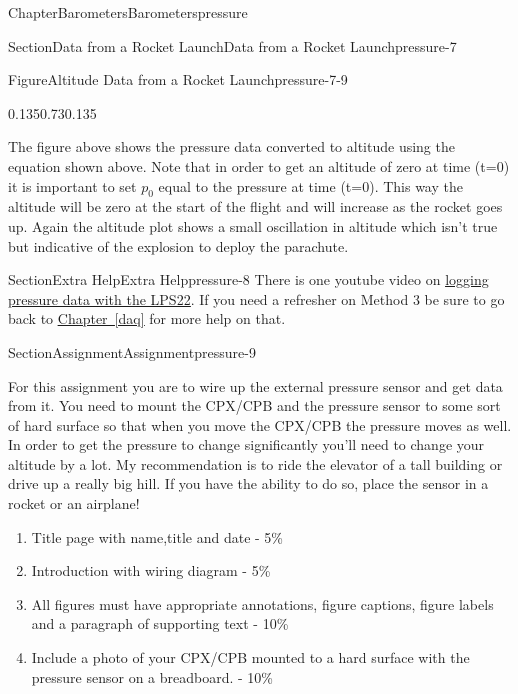 \documentclass[oneside,10pt,]{book}
\newcommand{\xreffont}{\relax}
\newcommand{\linkhilite}[1]{\underline{#1}}
\numberwithin{equation}{section}
\begin{document}
\begin{chapterptx}{Chapter}{Barometers}{}{Barometers}{}{}{pressure}
\begin{sectionptx}{Section}{Data from a Rocket Launch}{}{Data from a Rocket Launch}{}{}{pressure-7}
\begin{figureptx}{Figure}{Altitude Data from a Rocket Launch}{pressure-7-9}{}
\begin{image}{0.135}{0.73}{0.135}{}
\end{image}%
\tcblower
\end{figureptx}%
The figure above shows the pressure data converted to altitude using the equation shown above. Note that in order to get an altitude of zero at time (t=0) it is important to set \(p_0\) equal to the pressure at time (t=0). This way the altitude will be zero at the start of the flight and will increase as the rocket goes up. Again the altitude plot shows a small oscillation in altitude which isn't true but indicative of the explosion to deploy the parachute.%
\end{sectionptx}
%
%
\typeout{************************************************}
\typeout{************************************************}
%
\begin{sectionptx}{Section}{Extra Help}{}{Extra Help}{}{}{pressure-8}
There is one youtube video on \href{https://www.youtube.com/watch?v=MKq2glxVkMI}{\linkhilite{logging pressure data with the LPS22}}. If you need a refresher on Method 3 be sure to go back to \hyperref[daq]{\linkhilite{Chapter~{\xreffont\ref{daq}}}} for more help on that.%
\end{sectionptx}
%
%
\typeout{************************************************}
\typeout{************************************************}
%
\begin{sectionptx}{Section}{Assignment}{}{Assignment}{}{}{pressure-9}
\begin{introduction}{}%
For this assignment you are to wire up the external pressure sensor and get data from it. You need to mount the CPX\slash{}CPB and the pressure sensor to some sort of hard surface so that when you move the CPX\slash{}CPB the pressure moves as well. In order to get the pressure to change significantly you'll need to change your altitude by a lot. My recommendation is to ride the elevator of a tall building or drive up a really big hill. If you have the ability to do so, place the sensor in a rocket or an airplane!%
%
\begin{enumerate}
\item{}Title page with name,title and date - 5\%%
\item{}Introduction with wiring diagram - 5\%%
\item{}All figures must have appropriate annotations, figure captions, figure labels and a paragraph of supporting text - 10\%%
\item{}Include a photo of your CPX\slash{}CPB mounted to a hard surface with the pressure sensor on a breadboard. - 10\%%

\end{enumerate}
\end{introduction}
\end{sectionptx}
\end{chapterptx}
\end{document}
